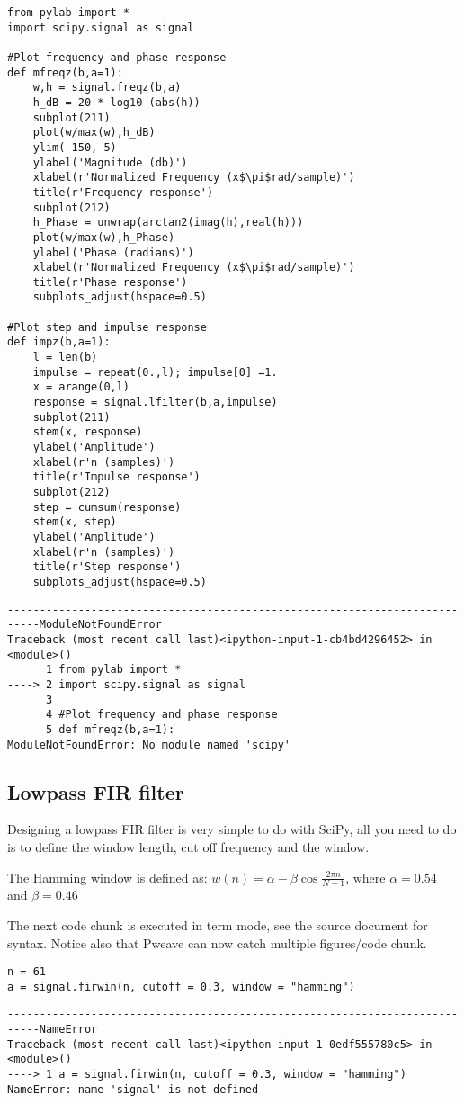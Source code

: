 \documentclass[a4paper,11pt,final]{article}
\begin{document}
\begin{verbatim}
from pylab import *
import scipy.signal as signal
    
#Plot frequency and phase response
def mfreqz(b,a=1):
    w,h = signal.freqz(b,a)
    h_dB = 20 * log10 (abs(h))
    subplot(211)
    plot(w/max(w),h_dB)
    ylim(-150, 5)
    ylabel('Magnitude (db)')
    xlabel(r'Normalized Frequency (x$\pi$rad/sample)')
    title(r'Frequency response')
    subplot(212)
    h_Phase = unwrap(arctan2(imag(h),real(h)))
    plot(w/max(w),h_Phase)
    ylabel('Phase (radians)')
    xlabel(r'Normalized Frequency (x$\pi$rad/sample)')
    title(r'Phase response')
    subplots_adjust(hspace=0.5)

#Plot step and impulse response
def impz(b,a=1):
    l = len(b)
    impulse = repeat(0.,l); impulse[0] =1.
    x = arange(0,l)
    response = signal.lfilter(b,a,impulse)
    subplot(211)
    stem(x, response)
    ylabel('Amplitude')
    xlabel(r'n (samples)')
    title(r'Impulse response')
    subplot(212)
    step = cumsum(response)
    stem(x, step)
    ylabel('Amplitude')
    xlabel(r'n (samples)')
    title(r'Step response')
    subplots_adjust(hspace=0.5)
\end{verbatim}
\begin{verbatim}
---------------------------------------------------------------------------ModuleNotFoundError
Traceback (most recent call last)<ipython-input-1-cb4bd4296452> in
<module>()
      1 from pylab import *
----> 2 import scipy.signal as signal
      3
      4 #Plot frequency and phase response
      5 def mfreqz(b,a=1):
ModuleNotFoundError: No module named 'scipy'
\end{verbatim}


\subsection{Lowpass FIR filter}

Designing a lowpass FIR filter is very simple to do with SciPy, all you
need to do is to define the window length, cut off frequency and the
window.

The Hamming window is defined as:
$w(n) = \alpha - \beta\cos\frac{2\pi n}{N-1}$, where $\alpha=0.54$ and
$\beta=0.46$

The next code chunk is executed in term mode, see the source document
for syntax. Notice also that Pweave can now catch multiple
figures/code chunk.


\begin{verbatim}
n = 61
a = signal.firwin(n, cutoff = 0.3, window = "hamming")
\end{verbatim}
\begin{verbatim}
---------------------------------------------------------------------------NameError
Traceback (most recent call last)<ipython-input-1-0edf555780c5> in
<module>()
----> 1 a = signal.firwin(n, cutoff = 0.3, window = "hamming")
NameError: name 'signal' is not defined
\end{verbatim}
\end{document}
